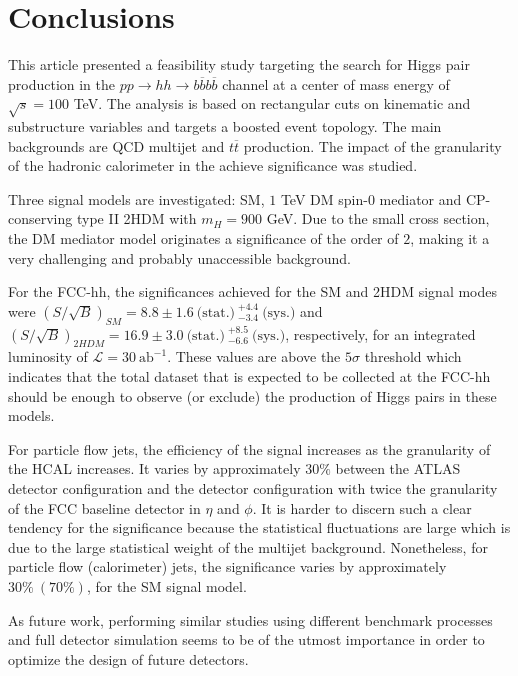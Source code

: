 
\section{Conclusions}
\label{sec:concl}

This article presented a feasibility study targeting the search for Higgs pair production in the $pp\rightarrow hh\rightarrow b\overline{b}b\overline{b}$ channel at a center of mass energy of $\sqrt{s}=100$ TeV. The analysis is based on rectangular cuts on kinematic and substructure variables and targets a boosted event topology. The main backgrounds are QCD multijet and $t\overline{t}$ production. The impact of the granularity of the hadronic calorimeter in the achieve significance was studied. 

Three signal models are investigated: SM, $1$ TeV DM spin-$0$ mediator and CP-conserving type II 2HDM with $m_H=900$ GeV. Due to the small cross section, the DM mediator model originates a significance of the order of $2$, making it a very challenging and probably unaccessible background. 

For the FCC-hh, the significances achieved for the SM and 2HDM signal modes were $(S/\sqrt{B})_{SM}=8.8\pm 1.6~\text{(stat.)}~^{+4.4}_{-3.4}~\text{(sys.)}$ and $(S/\sqrt{B})_{2HDM}=16.9\pm 3.0~\text{(stat.)}~^{+8.5}_{-6.6}~\text{(sys.)}$, respectively, for an integrated luminosity of $\mathcal{L}=30~\text{ab}^{-1}$. These values are above the $5\sigma$ threshold which indicates that the total dataset that is expected to be collected at the FCC-hh should be enough to observe (or exclude) the production of Higgs pairs in these models.

For particle flow jets, the efficiency of the signal increases as the granularity of the HCAL increases. It varies by approximately $30\%$ between the ATLAS detector configuration and the detector configuration with twice the granularity of the FCC baseline detector in $\eta$ and $\phi$. It is harder to discern such a clear tendency for the significance because the statistical fluctuations are large which is due to the large statistical weight of the multijet background. Nonetheless, for particle flow (calorimeter) jets, the significance varies by approximately $30\%~(70\%)$, for the SM signal model. 

As future work, performing similar studies using different benchmark processes and full detector simulation seems to be of the utmost importance in order to optimize the design of future detectors.


